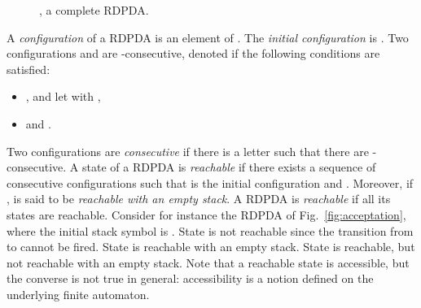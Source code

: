 \begin{figure}[t!]
\centering
{}
\caption{, a complete RDPDA.\label{figAutoPile1}}
\end{figure}

A {\it configuration} of a {RDPDA} is an element of . The
{\it initial configuration} is . Two
configurations  and  are -consecutive, denoted
 if the following conditions are satisfied:
\begin{itemize}
\item , and let  with ,
\item   and .
\end{itemize}
Two configurations are {\it consecutive} if there is a letter  such that there
are -consecutive. A state  of a RDPDA is {\it reachable} if there
exists a sequence of consecutive configurations 
such that  is the initial configuration and . Moreover, if
,  is said to be {\it reachable with an empty stack}. A
RDPDA is {\it reachable} if all its states are reachable. Consider for
instance the RDPDA of Fig.~\ref{fig:acceptation}, where the initial stack
symbol is . State  is not reachable since the transition from  to
 cannot be fired. State  is reachable with an empty stack. State  is
reachable, but not reachable with an empty stack. Note that a reachable
state is accessible, but the converse is not true in general: accessibility
is a notion defined on the underlying finite automaton. 

